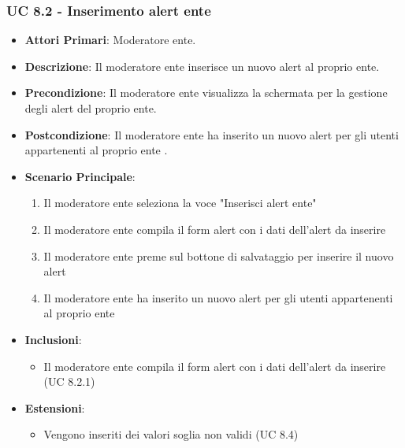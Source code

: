 			\subsubsection{UC 8.2 - Inserimento alert ente}
			\begin{itemize}
				\item \textbf{Attori Primari}: Moderatore ente.
				\item \textbf{Descrizione}: Il moderatore ente inserisce un nuovo alert al proprio ente.
				\item \textbf{Precondizione}: Il moderatore ente visualizza la schermata per la gestione degli alert del proprio ente.
				\item \textbf{Postcondizione}: Il moderatore ente ha inserito un nuovo alert per gli utenti appartenenti al proprio ente .
				\item \textbf{Scenario Principale}:
				\begin{enumerate}
					\item{Il moderatore ente seleziona la voce "Inserisci alert ente"}
					\item{Il moderatore ente compila il form alert con i dati dell'alert da inserire}
					\item{Il moderatore ente preme sul bottone di salvataggio per inserire il nuovo alert}
					\item{Il moderatore ente ha inserito un nuovo alert per gli utenti appartenenti al proprio ente }
				\end{enumerate}
				\item \textbf{Inclusioni}:
				\begin{itemize}
					\item Il moderatore ente compila il form alert con i dati dell'alert da inserire (UC 8.2.1)
				\end{itemize}
				\item \textbf{Estensioni}:
				\begin{itemize}
					\item Vengono inseriti dei valori soglia non validi (UC 8.4)
				\end{itemize}		
			\end{itemize}
			
